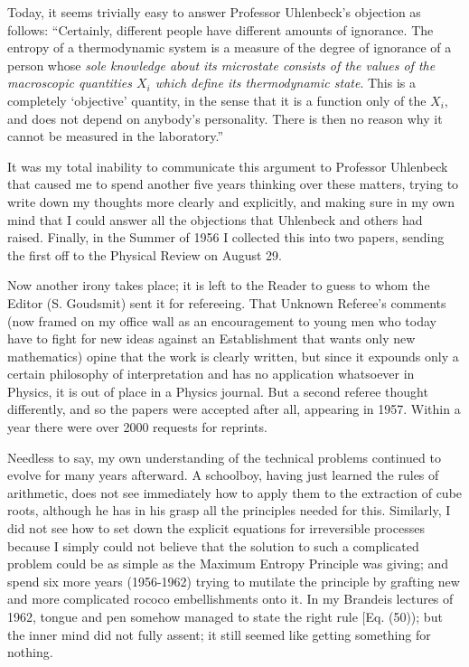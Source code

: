 Today, it seems trivially easy to answer Professor Uhlenbeck's objection as follows:
``Certainly, different people have different amounts of ignorance.
The entropy of a thermodynamic system is a measure of the degree of ignorance of a person whose \emph{sole knowledge about its microstate consists of the values of the macroscopic quantities $X_i$ which define its thermodynamic state}. This is a completely `objective' quantity, in the sense that it is a function only of the $X_i$, and does not depend on anybody's personality. There is then no reason why it cannot be measured in the laboratory.''

It was my total inability to communicate this argument to Professor Uhlenbeck that caused me to spend another five years thinking over these matters, trying to write down my thoughts more clearly and explicitly, and making sure in my own mind that I could answer all the objections that Uhlenbeck and others had raised.
Finally, in the Summer of 1956 I collected this into two papers, sending the first off to the Physical Review on August 29.

Now another irony takes place; it is left to the Reader to guess to whom the Editor (S. Goudsmit) sent it for refereeing.
That Unknown Referee's comments (now framed on my office wall as an encouragement to young men who today have to fight for new ideas against an Establishment that wants only new mathematics) opine that the work is clearly written, but since it expounds only a certain philosophy of interpretation and has no application whatsoever in Physics, it is out of place in a Physics journal.
But a second referee thought differently, and so the papers were accepted after all, appearing in 1957.
Within a year there were over 2000 requests for reprints.

Needless to say, my own understanding of the technical problems continued to evolve for many years afterward.
A schoolboy, having just learned the rules of arithmetic, does not see immediately how to apply them to the extraction of cube roots, although he has in his grasp all the principles needed for this.
Similarly, I did not see how to set down the explicit equations for irreversible processes because I simply could not believe that the solution to such a complicated problem could be as simple as the Maximum Entropy Principle was giving; and spend six more years (1956-1962) trying to mutilate the principle by grafting new and more complicated rococo embellishments onto it. In my Brandeis lectures of 1962, tongue and pen somehow managed to state the right rule [Eq. (50)); but the inner mind did not fully assent; it still seemed
like getting something for nothing.

